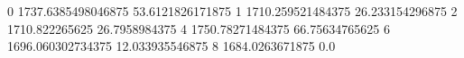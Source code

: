 0 1737.6385498046875 53.6121826171875
1 1710.259521484375 26.233154296875
2 1710.822265625 26.7958984375
4 1750.78271484375 66.75634765625
6 1696.060302734375 12.033935546875
8 1684.0263671875 0.0

